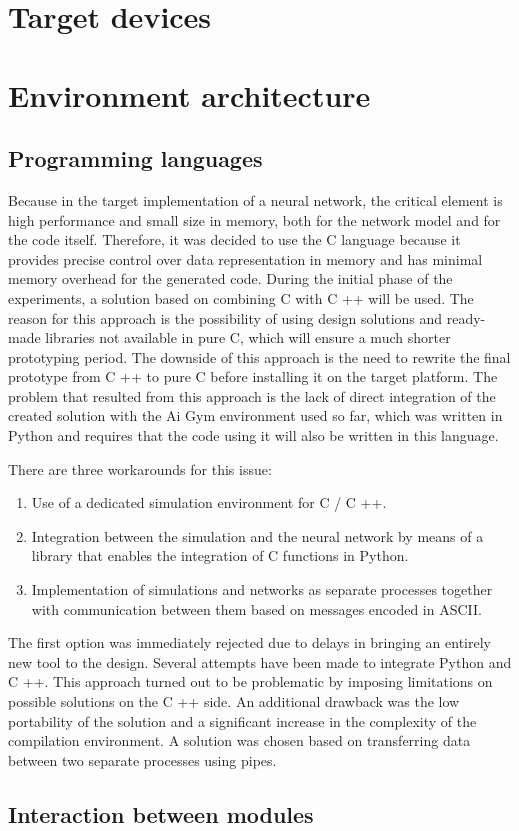 \section{Target devices}

\FloatBarrier
\section{Environment architecture}

\FloatBarrier
\subsection{Programming languages}
Because in the target implementation of a neural network, the critical element is high 
performance and small size in memory, both for the network model and for the code itself.
Therefore, it was decided to use the C language because it provides precise control over data 
representation in memory and has minimal memory overhead for the generated code. 
During the initial phase of the experiments, a solution based on combining C with C ++ will be
used. 
The reason for this approach is the possibility of using design solutions and ready-made
libraries not available in pure C, which will ensure a much shorter prototyping period. 
The downside of this approach is the need to rewrite the final prototype from C ++ to pure C 
before installing it on the target platform.
The problem that resulted from this approach is the lack of direct integration of the created
solution with the Ai Gym environment used so far, which was written in Python and requires that 
the code using it will also be written in this language.

There are three workarounds for this issue:
\begin{enumerate}
	\item Use of a dedicated simulation environment for C / C ++.
	\item Integration between the simulation and the neural network by means of a 
		  library that enables the integration of C functions in Python.
	\item Implementation of simulations and networks as separate processes together with 
		  communication between them based on messages encoded in ASCII. 
\end{enumerate}
The first option was immediately rejected due to delays in bringing an entirely new tool to 
the design.
Several attempts have been made to integrate Python and C ++.
This approach turned out to be problematic by imposing limitations on possible solutions on
the C ++ side. 
An additional drawback was the low portability of the solution and a significant increase
in the complexity of the compilation environment.
A solution was chosen based on transferring data between two separate processes using pipes.

\FloatBarrier
\subsection{Interaction between modules}

